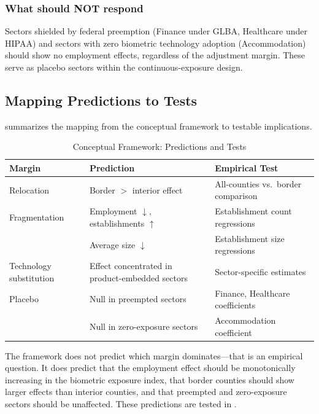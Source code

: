 \documentclass[12pt]{article}
\begin{document}
\subsubsection*{What should NOT respond} Sectors shielded by federal preemption (Finance under GLBA, Healthcare under HIPAA) and sectors with zero biometric technology adoption (Accommodation) should show no employment effects, regardless of the adjustment margin. These serve as placebo sectors within the continuous-exposure design.

\subsection{Mapping Predictions to Tests}

 summarizes the mapping from the conceptual framework to testable implications.

\begin{table}[htbp]
\centering
\caption{Conceptual Framework: Predictions and Tests}
\label{tab:predictions}
\small
\begin{tabular}{p{3cm}p{4.5cm}p{5cm}}
\toprule
Margin & Prediction & Empirical Test \\
\midrule
Relocation & Border $>$ interior effect & All-counties vs.\ border comparison \\
Fragmentation & Employment $\downarrow$, establishments $\uparrow$ & Establishment count regressions \\
 & Average size $\downarrow$ & Establishment size regressions \\
Technology substitution & Effect concentrated in product-embedded sectors & Sector-specific estimates \\
Placebo & Null in preempted sectors & Finance, Healthcare coefficients \\
 & Null in zero-exposure sectors & Accommodation coefficient \\
\bottomrule
\end{tabular}
\end{table}

The framework does not predict which margin dominates---that is an empirical question. It does predict that the employment effect should be monotonically increasing in the biometric exposure index, that border counties should show larger effects than interior counties, and that preempted and zero-exposure sectors should be unaffected. These predictions are tested in .

\end{document}
